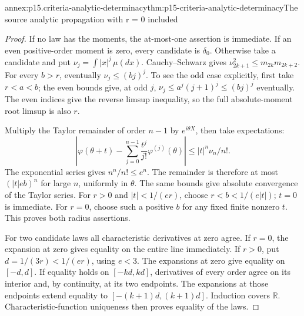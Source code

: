\begin{annexitem}{annex:p15.criteria-analytic-determinacy}{thm:p15-criteria-analytic-determinacy}{The source analytic propagation with r = 0 included}
\begin{proof}
If no law has the moments, the at-most-one
assertion is immediate. If an even positive-order
moment is zero, every candidate is \(\delta_0\).
Otherwise take a candidate and put
\(\nu_j=\int|x|^j\,\mu(dx)\).
Cauchy--Schwarz gives
\(\nu_{2k+1}^2\leq m_{2k}m_{2k+2}\).
For every \(b>r\), eventually
\(\nu_j\leq(bj)^j\).
To see the odd case explicitly, first take
\(r<a<b\); the even bounds give, at odd \(j\),
\(\nu_j\leq a^j(j+1)^j\leq(bj)^j\) eventually.
The even indices give the reverse limsup inequality,
so the full absolute-moment root limsup is also \(r\).

Multiply the Taylor remainder of order \(n-1\)
by \(e^{i\theta X}\), then take expectations:
\[
 \left|\varphi(\theta+t)-
   \sum_{j=0}^{n-1}\frac{t^j}{j!}\varphi^{(j)}(\theta)\right|
                               \leq |t|^n\nu_n/n!.
\]
The exponential series gives \(n^n/n!\leq e^n\).
The remainder is therefore at most \((|t|eb)^n\)
for large \(n\), uniformly in \(\theta\).
The same bounds give absolute convergence of
the Taylor series.
For \(r>0\) and \(|t|<1/(er)\), choose
\(r<b<1/(e|t|)\); \(t=0\) is immediate.
For \(r=0\), choose such a positive \(b\)
for any fixed finite nonzero \(t\).
This proves both radius assertions.

For two candidate laws all characteristic
derivatives at zero agree.
If \(r=0\), the expansion at zero gives
equality on the entire line immediately.
If \(r>0\), put \(d=1/(3r)<1/(er)\), using \(e<3\).
The expansions at zero give equality on \([-d,d]\).
If equality holds on \([-kd,kd]\), derivatives
of every order agree on its interior and,
by continuity, at its two endpoints.
The expansions at those endpoints extend
equality to \([-(k+1)d,(k+1)d]\).
Induction covers \(\mathbb R\).
Characteristic-function uniqueness then
proves equality of the laws.
\end{proof}
\end{annexitem}

